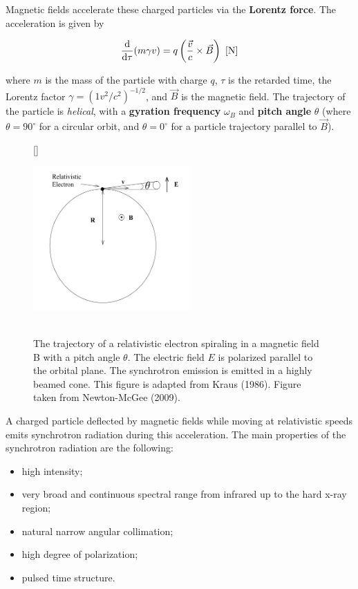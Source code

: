 \documentclass[a4paper,10pt]{article}
\begin{document}
{\noindent}Magnetic fields accelerate these charged particles via the \textbf{Lorentz force}. The acceleration is given by

\begin{align*}
    \frac{{\rm d}}{{\rm d}\tau}(m\gamma v) = q\left(\frac{\vec{v}}{c}\times\vec{B}\right) ~ [{\rm N}]
\end{align*}

{\noindent}where $m$ is the mass of the particle with charge $q$, $\tau$ is the retarded time, the Lorentz factor  $\gamma=(1 v^2/c^2)^{-1/2}$, and $\vec{B}$ is the magnetic field. The trajectory of the particle is \textit{helical}, with a \textbf{gyration frequency} $\omega_B$ and \textbf{pitch angle} $\theta$ (where $\theta=90^\circ$ for a circular orbit, and $\theta=0^\circ$ for a particle trajectory parallel to $\vec{B}$).

\begin{figure}[h]
    [\FBwidth]
    {\caption{\footnotesize{\\The trajectory of a relativistic electron spiraling in a magnetic field B with a pitch angle $\theta$. The electric field $E$ is polarized parallel to the orbital plane. The synchrotron emission is emitted in a highly beamed cone. This figure is adapted from Kraus (1986). Figure taken from Newton-McGee (2009).}}
    \label{fig:synchrotrondiagram}}
    {\includegraphics[width=6cm]{figures/SynchrotronDiagram.png}}
\end{figure}

{\noindent}A charged particle deflected by magnetic fields while moving at relativistic speeds emits synchrotron radiation during this acceleration. The main properties of the synchrotron radiation are the following:

\begin{itemize}
    \item high intensity;
    \item very broad and continuous spectral range from infrared up to the hard x-ray region;
    \item natural narrow angular collimation;
    \item high degree of polarization;
    \item pulsed time structure.
\end{itemize}
\end{document}
